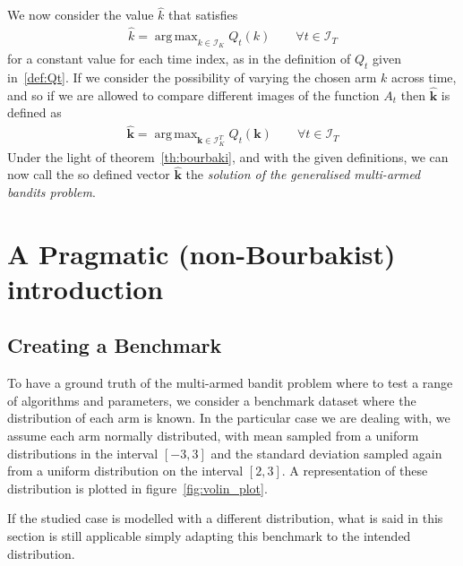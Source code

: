 \documentclass[]{scrartcl}
\DeclareMathOperator*{\argmax}{arg\,max}
\theoremstyle{definition}
\begin{document}
We now consider the value $\hat{k}$ that satisfies
\begin{align*}
\hat{k} = \argmax_{k \in \mathcal{I}_K} Q_t(k)
\qquad
\forall t \in \mathcal{I}_T
\end{align*}
for a constant value for each time index, as in the definition of $Q_t$ given in~\ref{def:Qt}.
If we consider the possibility of varying the chosen arm $k$ across time, and so if we are allowed to compare different images of the function $A_t$ then $\hat{\mathbf{k}}$ is defined as
\begin{align}\label{eq:bourbaki_solution}
\hat{\mathbf{k}}
=
\argmax_{\mathbf{k} \in \mathcal{I}_K^{T}} Q_t(\mathbf{k})
\qquad
\forall t \in \mathcal{I}_T
\end{align}
Under the light of theorem~\ref{th:bourbaki}, and with the given definitions, we can now call the so defined vector $\hat{\mathbf{k}}$ the \emph{solution of the generalised multi-armed bandits problem}.

\section{A Pragmatic (non-Bourbakist) introduction}
\label{se:pragmatic_perspective}

\subsection*{Creating a Benchmark}

To have a ground truth of the multi-armed bandit problem where to test a range of algorithms and parameters, we consider a benchmark dataset where the distribution of each arm is known.
In the particular case we are dealing with, we assume each arm normally distributed, with mean sampled from a uniform distributions in the interval $[-3, 3]$ and the standard deviation sampled again from a uniform distribution on the interval $[2, 3]$. A representation of these distribution is plotted in
figure~\ref{fig:volin_plot}.

If the studied case is modelled with a different distribution, what is said in this section is still applicable simply adapting this benchmark to the intended distribution.
\end{document}
